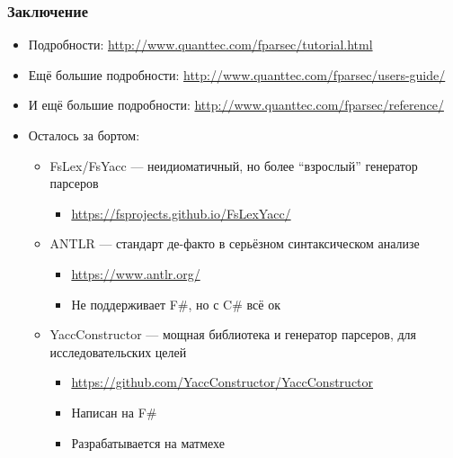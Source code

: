 \documentclass[xetex,mathserif,serif]{beamer}
\begin{document}
    \begin{frame}
        \frametitle{Заключение}
        \begin{small}
            \begin{itemize}
                \item Подробности: \url{http://www.quanttec.com/fparsec/tutorial.html}
                \item Ещё большие подробности: \url{http://www.quanttec.com/fparsec/users-guide/}
                \item И ещё большие подробности: \url{http://www.quanttec.com/fparsec/reference/}
                \item Осталось за бортом:
                    \begin{itemize}
                        \item FsLex/FsYacc --- неидиоматичный, но более ``взрослый'' генератор парсеров
                            \begin{itemize}
                                \item \url{https://fsprojects.github.io/FsLexYacc/}
                            \end{itemize}
                        \item ANTLR --- стандарт де-факто в серьёзном синтаксическом анализе
                            \begin{itemize}
                                \item \url{https://www.antlr.org/}
                                \item Не поддерживает F\#, но с C\# всё ок
                            \end{itemize}
                        \item YaccConstructor --- мощная библиотека и генератор парсеров, для исследовательских целей
                            \begin{itemize}
                                \item \url{https://github.com/YaccConstructor/YaccConstructor}
                                \item Написан на F\#
                                \item Разрабатывается на матмехе
                            \end{itemize}
                    \end{itemize}
            \end{itemize}
        \end{small}
    \end{frame}
\end{document}
